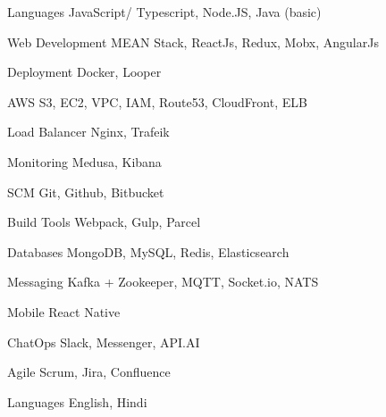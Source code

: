 

\begin{cvskills}


\cvskill
{Languages} %
{JavaScript/ Typescript, Node.JS, Java (basic)} %


\cvskill
{Web Development} %
{MEAN Stack, ReactJs, Redux, Mobx, AngularJs} %

\cvskill
{Deployment} %
{Docker, Looper} %

\cvskill
{AWS} %
{S3, EC2, VPC, IAM, Route53, CloudFront, ELB} %

\cvskill
{Load Balancer} %
{Nginx, Trafeik} %

\cvskill
{Monitoring} %
{Medusa, Kibana} %

\cvskill
{SCM} %
{Git, Github, Bitbucket} %

\cvskill
{Build Tools} %
{Webpack, Gulp, Parcel} %


\cvskill
{Databases} %
{MongoDB, MySQL, Redis, Elasticsearch} %

\cvskill
{Messaging} %
{Kafka + Zookeeper, MQTT, Socket.io, NATS} %

\cvskill
{Mobile} %
{React Native} %

\cvskill
{ChatOps} %
{Slack, Messenger, API.AI} %

\cvskill
{Agile} %
{Scrum, Jira, Confluence} %


\cvskill
{Languages} %
{English, Hindi} %


\end{cvskills}
